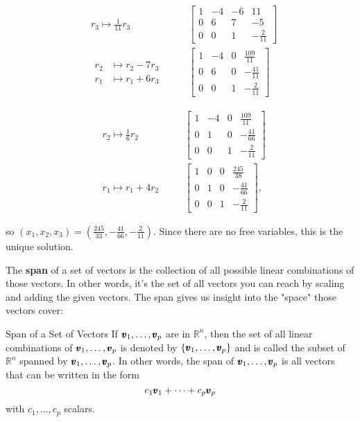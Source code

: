 \begin{example}
\[
\begin{alignedat}{3}
& r_3 \mapsto \frac{1}{11} r_3 \quad &
& \left[\begin{array}{cccc}
1 & -4 & -6 & 11 \\
0 & 6 & 7 & -5 \\
0 & 0 & 1 & -\frac{2}{11}
\end{array}\right] \\[10pt]
& \begin{aligned}
    r_2 & \mapsto r_2 - 7r_3 \\
    r_1 & \mapsto r_1 + 6r_3
\end{aligned} & \quad &
\left[\begin{array}{cccc}
1 & -4 & 0 & \frac{109}{11} \\
0 & 6 & 0 & -\frac{41}{11} \\
0 & 0 & 1 & -\frac{2}{11}
\end{array}\right]
\end{alignedat}
\]

\[
\begin{alignedat}{3}
& r_2 \mapsto \frac{1}{6}r_2 \quad &
& \left[\begin{array}{cccc}
1 & -4 & 0 & \frac{109}{11} \\
0 & 1 & 0 & -\frac{41}{66} \\
0 & 0 & 1 & -\frac{2}{11}
\end{array}\right] \\[10pt]
& r_1 \mapsto r_1 + 4r_2 \quad &
& \left[\begin{array}{cccc}
1 & 0 & 0 & \frac{245}{38} \\
0 & 1 & 0 & -\frac{41}{66} \\
0 & 0 & 1 & -\frac{2}{11}
\end{array}\right],
\end{alignedat}
\]

so $\left(x_1, x_2, x_3\right)=\left(\frac{245}{33},-\frac{41}{66},-\frac{2}{11}\right)$. Since there are no free variables, this is the unique solution.

\end{example}

The \textbf{span} of a set of vectors is the collection of all possible linear combinations of those vectors. In other words, it's the set of all vectors you can reach by scaling and adding the given vectors. The span gives us insight into the "space" those vectors cover:

\begin{definition}{Span of a Set of Vectors}
    If $\pmb{v}_1, \ldots, \pmb{v}_p$ are in $\mathbb{R}^n$, then the set of all linear combinations of $\pmb{v}_1, \ldots, \pmb{v}_p$ is denoted by  $\left\{\pmb{v}_1, \ldots, \pmb{v}_p\right\}$ and is called the subset of $\mathbb{R}^n$ spanned by $\pmb{v}_1, \ldots, \pmb{v}_p$. In other words, the span of $\pmb{v}_1, \ldots, \pmb{v}_p$ is all vectors that can be written in the form
    $$
    c_1 \pmb{v}_1 + \cdots + c_p \pmb{v}_p
    $$
    with $c_1, \ldots, c_p$ scalars.

\end{definition}

